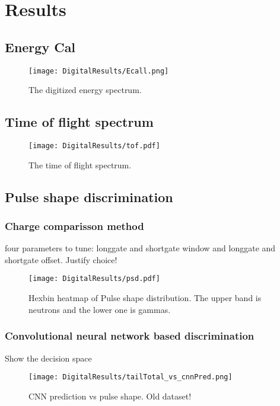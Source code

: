 \documentclass[main.tex]{subfiles}
\begin{document}
\section{Results}
\subsection{Energy Cal}
\begin{figure}[ht]
    \centering
        \texttt{[image: DigitalResults/Ecall.png]}
        \caption{The digitized energy spectrum.}
    \label{fig:D_QDC}
\end{figure}


\subsection{Time of flight spectrum}
\begin{figure}[ht!]
    \centering
        \texttt{[image: DigitalResults/tof.pdf]}
        \caption{The time of flight spectrum.}
    \label{fig:D_PSD_TOF} 
\end{figure}

\subsection{Pulse shape discrimination}
\subsubsection{Charge comparisson method}
four parameters to tune: longgate and shortgate window and longgate and shortgate offset. Justify choice!
\begin{figure}[ht!]
    \centering
        \texttt{[image: DigitalResults/psd.pdf]}
        \caption{Hexbin heatmap of Pulse shape distribution. The upper band is neutrons and the lower one is gammas.}
        \label{fig:hex_a}
\end{figure}
\subsubsection{Convolutional neural network based discrimination}
Show the decision space
\begin{figure}[ht!]
    \centering
        \texttt{[image: DigitalResults/tailTotal\_vs\_cnnPred.png]}
        \caption{CNN prediction vs pulse shape. Old dataset!}
    \label{fig:tof_ps_d} 
\end{figure}
\end{document}
